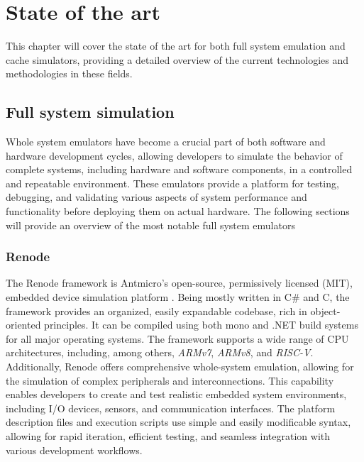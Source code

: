 
\chapter{State of the art}
This chapter will cover the state of the art for both full system emulation and cache simulators, providing a detailed overview of the current technologies and methodologies in these fields.

\section{Full system simulation}
Whole system emulators have become a crucial part of both software and hardware development cycles, allowing developers to simulate the behavior of complete systems, including
hardware and software components, in a controlled and repeatable environment. These emulators provide a platform for testing, debugging, and validating various aspects of system
performance and functionality before deploying them on actual hardware. The following sections will provide an overview of the most notable full system emulators

\subsection{Renode}

The Renode framework is Antmicro’s open-source, permissively licensed (MIT), embedded device simulation platform \cite{Renode}. Being mostly written in C\# and C, the framework provides an organized,
easily expandable codebase, rich in object-oriented principles. It can be compiled using both mono and .NET build systems for all major operating systems.
The framework supports a wide range of CPU architectures, including, among others, \textit{ARMv7}, \textit{ARMv8}, and \textit{RISC-V}.
Additionally, Renode offers comprehensive whole-system emulation, allowing for the simulation of complex peripherals and interconnections. This capability enables developers to
create and test realistic embedded system environments, including I/O devices, sensors, and communication interfaces. The platform description files and execution scripts
use simple and easily modificable syntax, allowing for rapid iteration, efficient testing, and seamless integration with various development workflows.

